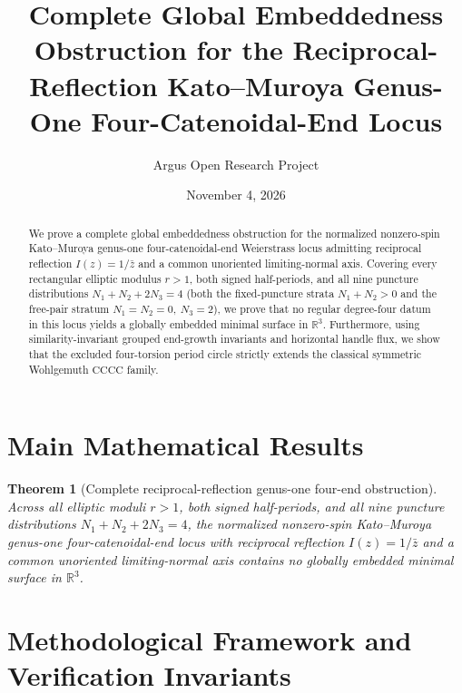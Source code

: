 \documentclass[10pt,reqno]{amsart}
\title[Global Obstruction for Reciprocal-Reflection Genus-One Four-Noids]
{Complete Global Embeddedness Obstruction for the Reciprocal-Reflection Kato--Muroya Genus-One Four-Catenoidal-End Locus}
\author{Argus Open Research Project}
\date{November 4, 2026}
\newtheorem{theorem}{Theorem}[section]
\theoremstyle{definition}
\begin{document}
\begin{abstract}
We prove a complete global embeddedness obstruction for the normalized nonzero-spin Kato--Muroya genus-one four-catenoidal-end Weierstrass locus admitting reciprocal reflection $I(z)=1/\bar{z}$ and a common unoriented limiting-normal axis. Covering every rectangular elliptic modulus $r > 1$, both signed half-periods, and all nine puncture distributions $N_1 + N_2 + 2N_3 = 4$ (both the fixed-puncture strata $N_1+N_2 > 0$ and the free-pair stratum $N_1=N_2=0,\ N_3=2$), we prove that no regular degree-four datum in this locus yields a globally embedded minimal surface in $\mathbb{R}^3$. Furthermore, using similarity-invariant grouped end-growth invariants and horizontal handle flux, we show that the excluded four-torsion period circle strictly extends the classical symmetric Wohlgemuth $\mathrm{CCCC}$ family.
\end{abstract}
\maketitle

\section{Main Mathematical Results}
\begin{theorem}[Complete reciprocal-reflection genus-one four-end obstruction]
Across all elliptic moduli $r > 1$, both signed half-periods, and all nine puncture distributions $N_1 + N_2 + 2N_3 = 4$, the normalized nonzero-spin Kato--Muroya genus-one four-catenoidal-end locus with reciprocal reflection $I(z)=1/\bar{z}$ and a common unoriented limiting-normal axis contains no globally embedded minimal surface in $\mathbb{R}^3$.
\end{theorem}

\section{Methodological Framework and Verification Invariants}
\end{document}
